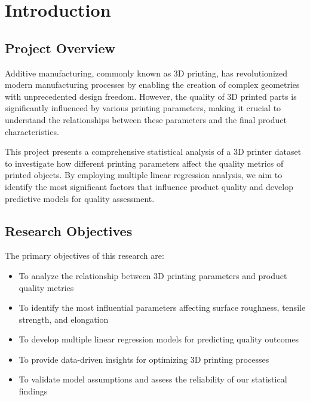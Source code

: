 
\section{Introduction}

\subsection{Project Overview}

Additive manufacturing, commonly known as 3D printing, has revolutionized modern manufacturing processes by enabling the creation of complex geometries with unprecedented design freedom. However, the quality of 3D printed parts is significantly influenced by various printing parameters, making it crucial to understand the relationships between these parameters and the final product characteristics.

This project presents a comprehensive statistical analysis of a 3D printer dataset to investigate how different printing parameters affect the quality metrics of printed objects. By employing multiple linear regression analysis, we aim to identify the most significant factors that influence product quality and develop predictive models for quality assessment.

\subsection{Research Objectives}

The primary objectives of this research are:

\begin{itemize}
    \item To analyze the relationship between 3D printing parameters and product quality metrics
    \item To identify the most influential parameters affecting surface roughness, tensile strength, and elongation
    \item To develop multiple linear regression models for predicting quality outcomes
    \item To provide data-driven insights for optimizing 3D printing processes
    \item To validate model assumptions and assess the reliability of our statistical findings
\end{itemize}

